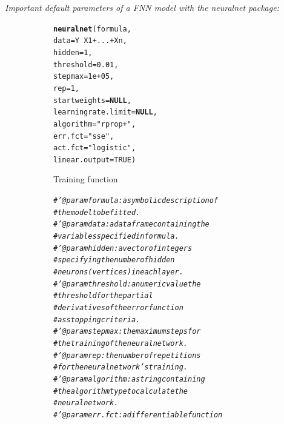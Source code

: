 \documentclass[letter,8pt]{article}\usepackage[]{graphicx}\usepackage[]{color}
\makeatletter
\newcommand{\hlnum}[1]{\textcolor[rgb]{0.686,0.059,0.569}{#1}}%
\newcommand{\hlstr}[1]{\textcolor[rgb]{0.192,0.494,0.8}{#1}}%
\newcommand{\hlcom}[1]{\textcolor[rgb]{0.678,0.584,0.686}{\textit{#1}}}%
\newcommand{\hlopt}[1]{\textcolor[rgb]{0,0,0}{#1}}%
\newcommand{\hlstd}[1]{\textcolor[rgb]{0.345,0.345,0.345}{#1}}%
\newcommand{\hlkwa}[1]{\textcolor[rgb]{0.161,0.373,0.58}{\textbf{#1}}}%
\newcommand{\hlkwc}[1]{\textcolor[rgb]{0.333,0.667,0.333}{#1}}%
\newcommand{\hlkwd}[1]{\textcolor[rgb]{0.737,0.353,0.396}{\textbf{#1}}}%
\newenvironment{kframe}{%
 \def\at@end@of@kframe{}%
 \ifinner\ifhmode%
  \def\at@end@of@kframe{\end{minipage}}%
  \begin{minipage}{\columnwidth}%
 \fi\fi%
 \def\FrameCommand##1{\hskip\@totalleftmargin \hskip-\fboxsep
 \colorbox{shadecolor}{##1}\hskip-\fboxsep
     \hskip-\linewidth \hskip-\@totalleftmargin \hskip\columnwidth}%
 \MakeFramed {\advance\hsize-\width
   \@totalleftmargin\z@ \linewidth\hsize
   \@setminipage}}%
 {\par\unskip\endMakeFramed%
 \at@end@of@kframe}
\newenvironment{knitrout}{}{} %
\makeatother
\begin{document}
\textit{Important default parameters of a FNN model with the neuralnet package:}
\begin{figure}[H]
  \begin{subfigure}{0.5\textwidth}
\begin{knitrout}
\color{fgcolor}\begin{kframe}
\begin{alltt}
\hlkwd{neuralnet}\hlstd{(formula,}
      \hlkwc{data} \hlstd{= Y}\hlopt{~}\hlstd{X1}\hlopt{+}\hlstd{...}\hlopt{+}\hlstd{Xn,}
      \hlkwc{hidden} \hlstd{=} \hlnum{1}\hlstd{,}
      \hlkwc{threshold} \hlstd{=} \hlnum{0.01}\hlstd{,}
      \hlkwc{stepmax} \hlstd{=} \hlnum{1e+05}\hlstd{,}
      \hlkwc{rep} \hlstd{=} \hlnum{1}\hlstd{,}
      \hlkwc{startweights} \hlstd{=} \hlkwa{NULL}\hlstd{,}
      \hlkwc{learningrate.limit} \hlstd{=} \hlkwa{NULL}\hlstd{,}
      \hlkwc{algorithm} \hlstd{=} \hlstr{"rprop+"}\hlstd{,}
      \hlkwc{err.fct} \hlstd{=} \hlstr{"sse"}\hlstd{,}
      \hlkwc{act.fct} \hlstd{=} \hlstr{"logistic"}\hlstd{,}
      \hlkwc{linear.output} \hlstd{=} \hlnum{TRUE}\hlstd{)}
\end{alltt}
\end{kframe}
\end{knitrout}
    \caption{Training function}
  \end{subfigure}
  \begin{subfigure}{0.5\textwidth}
    \centering
\begin{knitrout}
\color{fgcolor}\begin{kframe}
\begin{alltt}
\hlcom{#' @param formula : a symbolic description of }
\hlcom{#         the model to be fitted.}
\hlcom{#' @param data : a data frame containing the }
\hlcom{#         variables specified in formula.}
\hlcom{#' @param hidden : a vector of integers }
\hlcom{#         specifying the number of hidden }
\hlcom{#         neurons (vertices) in each layer.}
\hlcom{#' @param threshold : a numeric valuethe }
\hlcom{#         threshold for the partial }
\hlcom{#         derivatives of the error function }
\hlcom{#         as stopping criteria.}
\hlcom{#' @param stepmax : the maximum steps for }
\hlcom{#         the training of the neural network.}
\hlcom{#' @param rep : the number of repetitions }
\hlcom{#         for the neural network’s training.}
\hlcom{#' @param algorithm : a string containing }
\hlcom{#         the algorithm type to calculate the }
\hlcom{#         neural network.}
\hlcom{#' @param err.fct : a differentiable function }

\end{alltt}
\end{kframe}
\end{knitrout}
\end{subfigure}
\end{figure}
\end{document}

